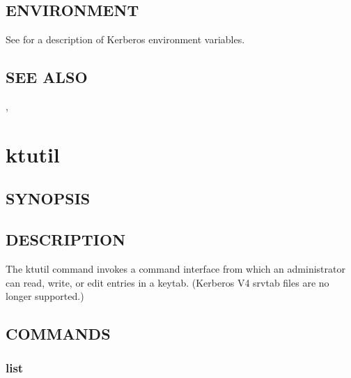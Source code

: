 \documentclass[letterpaper,10pt,english]{sphinxmanual}
\begin{document}
\subsection{ENVIRONMENT}
\label{\detokenize{admin/admin_commands/kproplog:environment}}
See  for a description of Kerberos environment
variables.


\subsection{SEE ALSO}
\label{\detokenize{admin/admin_commands/kproplog:see-also}}
{\hyperref[\detokenize{admin/admin_commands/kpropd:kpropd-8}]{}}, 


\section{ktutil}
\label{\detokenize{admin/admin_commands/ktutil:ktutil-1}}\label{\detokenize{admin/admin_commands/ktutil::doc}}\label{\detokenize{admin/admin_commands/ktutil:ktutil}}

\subsection{SYNOPSIS}
\label{\detokenize{admin/admin_commands/ktutil:synopsis}}


\subsection{DESCRIPTION}
\label{\detokenize{admin/admin_commands/ktutil:description}}
The ktutil command invokes a command interface from which an
administrator can read, write, or edit entries in a keytab.  (Kerberos
V4 srvtab files are no longer supported.)


\subsection{COMMANDS}
\label{\detokenize{admin/admin_commands/ktutil:commands}}

\subsubsection{list}
\label{\detokenize{admin/admin_commands/ktutil:list}}\begin{quote}

\end{quote}
\end{document}
